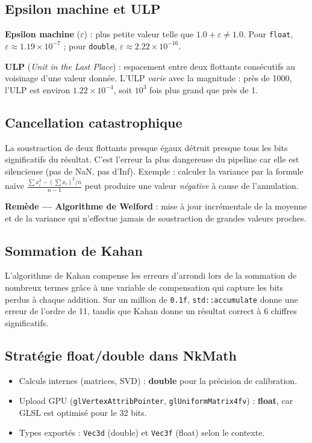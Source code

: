 \documentclass[11pt,a4paper]{article}
\begin{document}
\subsection{Epsilon machine et ULP}
\textbf{Epsilon machine} ($\varepsilon$) : plus petite valeur telle que $1.0 + \varepsilon \neq 1.0$.
Pour \texttt{float}, $\varepsilon \approx 1.19\times10^{-7}$ ; pour \texttt{double},
$\varepsilon \approx 2.22\times10^{-16}$.

\textbf{ULP} (\textit{Unit in the Last Place}) : espacement entre deux flottants consécutifs au
voisinage d'une valeur donnée. L'ULP \textit{varie} avec la magnitude : près de 1000, l'ULP est
environ $1.22\times10^{-4}$, soit $10^3$ fois plus grand que près de 1.

\subsection{Cancellation catastrophique}
La soustraction de deux flottants presque égaux détruit presque tous les bits significatifs du
résultat. C'est l'erreur la plus dangereuse du pipeline car elle est silencieuse (pas de NaN,
pas d'Inf). Exemple : calculer la variance par la formule naïve
$\frac{\sum x_i^2 - (\sum x_i)^2/n}{n-1}$
peut produire une valeur \textit{négative} à cause de l'annulation.

\textbf{Remède — Algorithme de Welford} : mise à jour incrémentale de la moyenne et de la
variance qui n'effectue jamais de soustraction de grandes valeurs proches.

\subsection{Sommation de Kahan}
L'algorithme de Kahan compense les erreurs d'arrondi lors de la sommation de nombreux termes
grâce à une variable de compensation qui capture les bits perdus à chaque addition. Sur un million
de \texttt{0.1f}, \texttt{std::accumulate} donne une erreur de l'ordre de 11, tandis que Kahan
donne un résultat correct à 6 chiffres significatifs.

\subsection{Stratégie float/double dans NkMath}
\begin{itemize}[noitemsep]
  \item Calculs internes (matrices, SVD) : \textbf{double} pour la précision de calibration.
  \item Upload GPU (\texttt{glVertexAttribPointer}, \texttt{glUniformMatrix4fv}) : \textbf{float},
        car GLSL est optimisé pour le 32 bits.
  \item Types exportés : \texttt{Vec3d} (double) et \texttt{Vec3f} (float) selon le contexte.
\end{itemize}
\end{document}
